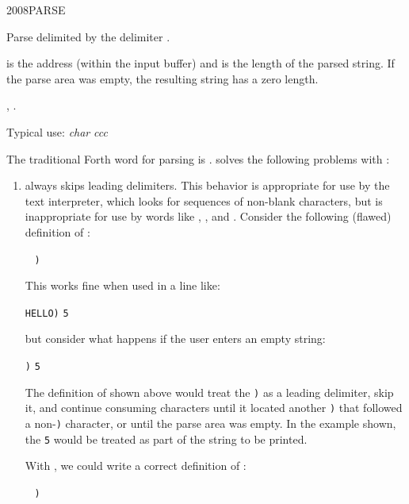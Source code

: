 \vspace*{-6ex}
\begin{worddef}{2008}{PARSE}
\item {}

	Parse  delimited by the delimiter .

	 is the address (within the input buffer) and
	 is the length of the parsed string. If the parse area
	was empty, the resulting string has a zero length.

\see {},
	.

	\begin{rationale} %
		Typical use: \emph{char}  \emph{ccc}

		The traditional Forth word for parsing is .
		 solves the following problems with :

		\begin{enumerate}
		\item {} always skips leading delimiters. This
			behavior is appropriate for use by the text interpreter,
			which looks for sequences of non-blank characters, but is
			inappropriate for use by words like  , ,
			and . Consider the following (flawed) definition
			of :

			\tab \word{:}  ~
				\word{[CHAR]} \texttt{)} ~
				  
			\word{;} ~ 

			This works fine when used in a line like:

			\tab {} \texttt{HELLO)} \quad \texttt{5} 

			but consider what happens if the user enters an empty
			string:

			\tab {} \texttt{)} \quad \texttt{5} 

			The definition of  shown above would treat the
			\texttt{)} as a leading delimiter, skip it, and continue
			consuming characters until it located another \texttt{)}
			that followed a non-\texttt{)} character, or until the
			parse area was empty. In the example shown, the
			\texttt{5} 
			would be treated as part of the string to be printed.

			With , we could write a correct definition of
			:

			\tab \word{:}  ~
				\word{[CHAR]} \texttt{)} ~
				 
			\word{;} ~ 


\end{enumerate}
\end{rationale}
\end{worddef}
